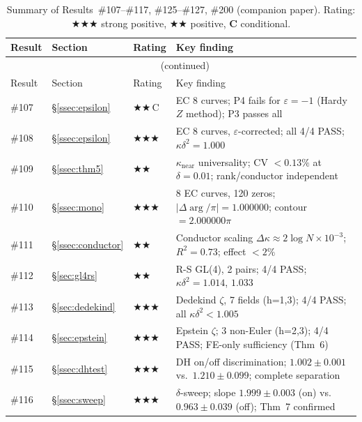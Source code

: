 \documentclass[11pt, a4paper]{article}
\theoremstyle{plain}
\theoremstyle{definition}
\begin{document}
\begin{longtable}{lllp{5.5cm}}
\caption{Summary of Results~\#107--\#117, \#125--\#127, \#200 (companion paper). Rating: \textbf{$\bigstar\bigstar\bigstar$} strong
  positive, \textbf{$\bigstar\bigstar$} positive, \textbf{C} conditional.}
\label{tab:summary}\\
\toprule
Result & Section & Rating & Key finding \\
\midrule
\endfirsthead
\multicolumn{4}{c}{\tablename~\thetable{} (continued)}\\
\toprule
Result & Section & Rating & Key finding \\
\midrule
\endhead
\bottomrule
\endfoot
\#107 & \S\ref{ssec:epsilon}      & \textbf{$\bigstar\bigstar$}\,C  & EC 8 curves; P4 fails for $\varepsilon=-1$ (Hardy $Z$ method); P3 passes all \\
\#108 & \S\ref{ssec:epsilon}      & \textbf{$\bigstar\bigstar\bigstar$}    & EC 8 curves, $\varepsilon$-corrected; all 4/4 PASS; $\kappa\delta^{2}=1.000$ \\
\#109 & \S\ref{ssec:thm5}         & \textbf{$\bigstar\bigstar$}     & $\kappa_{\text{near}}$ universality; CV $<0.13\%$ at $\delta=0.01$; rank/conductor independent \\
\#110 & \S\ref{ssec:mono}         & \textbf{$\bigstar\bigstar\bigstar$}    & 8 EC curves, 120 zeros; $|\Delta\!\arg/\pi|=1.000000$; contour $=2.000000\pi$ \\
\#111 & \S\ref{ssec:conductor}    & \textbf{$\bigstar\bigstar$}     & Conductor scaling $\Delta\kappa\approx 2\log N\times 10^{-3}$; $R^{2}=0.73$; effect $<2\%$ \\
\#112 & \S\ref{sec:gl4rs}         & \textbf{$\bigstar\bigstar$}     & R-S GL(4), 2 pairs; 4/4 PASS; $\kappa\delta^{2}=1.014$, $1.033$ \\
\#113 & \S\ref{sec:dedekind}      & \textbf{$\bigstar\bigstar\bigstar$}    & Dedekind $\zeta$, 7 fields (h=1,3); 4/4 PASS; all $\kappa\delta^{2}<1.005$ \\
\#114 & \S\ref{sec:epstein}       & \textbf{$\bigstar\bigstar\bigstar$}    & Epstein $\zeta$; 3 non-Euler (h=2,3); 4/4 PASS; FE-only sufficiency (Thm~6) \\
\#115 & \S\ref{ssec:dhtest}       & \textbf{$\bigstar\bigstar\bigstar$}    & DH on/off discrimination; $1.002\pm0.001$ vs.\ $1.210\pm0.099$; complete separation \\
\#116 & \S\ref{ssec:sweep}        & \textbf{$\bigstar\bigstar\bigstar$}    & $\delta$-sweep; slope $1.999\pm0.003$ (on) vs.\ $0.963\pm0.039$ (off); Thm~7 confirmed \\

\end{longtable}
\end{document}
